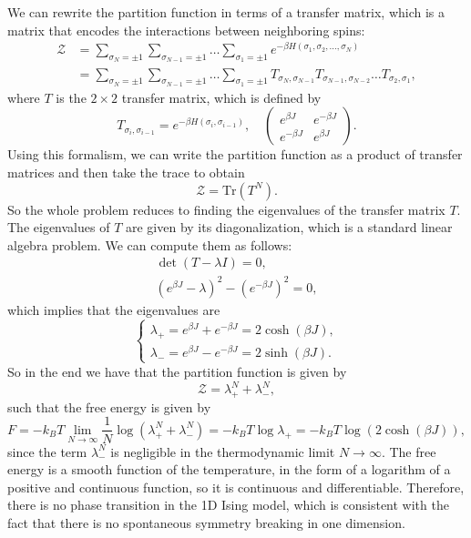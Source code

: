 We can rewrite the partition function in terms of a transfer matrix, which is a matrix that encodes the interactions between neighboring spins:
\[
    \begin{aligned}
        \mathcal{Z} & = \sum_{\sigma_N = \pm 1} \sum_{\sigma_{N-1} = \pm 1} \dots \sum_{\sigma_1 = \pm 1} e^{-\beta H(\sigma_1, \sigma_2, \dots, \sigma_N)}                                       \\
                    & = \sum_{\sigma_N = \pm 1} \sum_{\sigma_{N-1} = \pm 1} \dots \sum_{\sigma_1 = \pm 1} T_{\sigma_N, \sigma_{N-1}} T_{\sigma_{N-1}, \sigma_{N-2}} \dots T_{\sigma_2, \sigma_1},
    \end{aligned}
\]
where \(T\) is the \(2\times 2\) transfer matrix, which is defined by
\[
    T_{\sigma_i, \sigma_{i-1}} = e^{-\beta H(\sigma_i, \sigma_{i-1})}, \quad \begin{pmatrix}
        e^{\beta J}   & e^{- \beta J} \\
        e^{- \beta J} & e^{\beta J}
    \end{pmatrix}.
\]
Using this formalism, we can write the partition function as a product of transfer matrices and then take the trace to obtain
\[
    \mathcal{Z} = \text{Tr}(T^N).
\]
So the whole problem reduces to finding the eigenvalues of the transfer matrix \(T\). The eigenvalues of \(T\) are given by its diagonalization, which is a standard linear algebra problem. We can compute them as follows:
\[
    \begin{aligned}
        \det(T - \lambda I) = 0, \\
        (e^{\beta J} - \lambda)^2 - (e^{- \beta J})^2 = 0,
    \end{aligned}
\]
which implies that the eigenvalues are
\[
    \begin{cases}
        \lambda_+ = e^{\beta J} + e^{- \beta J} = 2 \cosh(\beta J), \\
        \lambda_- = e^{\beta J} - e^{- \beta J} = 2 \sinh(\beta J).
    \end{cases}
\]
So in the end we have that the partition function is given by
\[
    \mathcal{Z} = \lambda_+^N + \lambda_-^N,
\]
such that the free energy is given by
\[
    F = - k_B T \lim_{N \to \infty} \frac{1}{N} \log(\lambda_+^N + \lambda_-^N) = - k_B T \log \lambda_+ = - k_B T \log(2 \cosh(\beta J)),
\]
since the term \(\lambda_-^N\) is negligible in the thermodynamic limit \(N \to \infty\). The free energy is a smooth function of the temperature, in the form of a logarithm of a positive and continuous function, so it is continuous and differentiable. Therefore, there is no phase transition in the 1D Ising model, which is consistent with the fact that there is no spontaneous symmetry breaking in one dimension.

